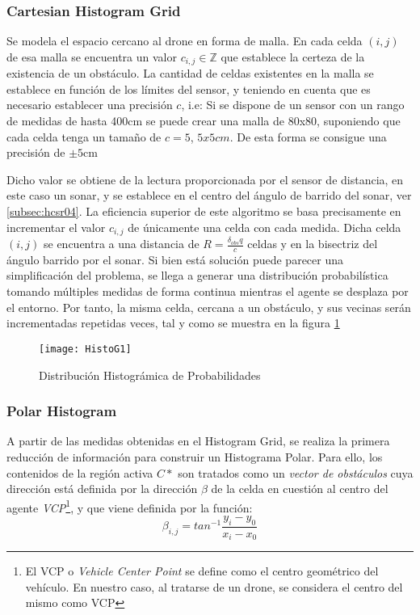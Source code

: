 \subsubsection{Cartesian Histogram Grid}
\label{subsubsec:CHG}
Se modela el espacio cercano al drone en forma de malla. En cada celda $(i,j)$ de esa malla se encuentra un valor $c_{i,j} \in \mathbb{Z}$ que establece la certeza de la existencia de un obstáculo. La cantidad de celdas existentes en la malla se establece en función de los límites del sensor, y teniendo en cuenta que es necesario establecer una precisión $c$, i.e: Si se dispone de un sensor con un rango de medidas de hasta 400cm se puede crear una malla de 80x80, suponiendo que cada celda tenga un tamaño de $c=5$, $5x5cm$. De esta forma se consigue una precisión de $\pm5\text{cm}$

Dicho valor se obtiene de la lectura proporcionada por el sensor de distancia, en este caso un sonar, y se establece en el centro del ángulo de barrido del sonar, ver \ref{subsec:hcsr04}. 
La eficiencia superior de este algoritmo se basa precisamente en incrementar el valor $c_{i,j}$ de únicamente una celda con cada medida. Dicha celda $(i,j)$ se encuentra a una distancia de $R = \frac{\delta_{obs}q}{c}$ celdas y en la bisectriz del ángulo barrido por el sonar.
Si bien está solución puede parecer una simplificación del problema, se llega a generar una distribución probabilística tomando múltiples medidas de forma continua mientras el agente se desplaza por el entorno. Por tanto, la misma celda, cercana a un obstáculo, y sus vecinas serán incrementadas repetidas veces, tal y como se muestra en la figura \ref{fig:histog1}
 \begin{figure}[H]
	\centering
	\texttt{[image: HistoG1]}
	\caption{Distribución Histográmica de Probabilidades}\label{fig:histog1}
\end{figure}

\subsubsection{Polar Histogram}
\label{subsubsec:PH}
A partir de las medidas obtenidas en el Histogram Grid, se realiza la primera reducción de información para construir un Histograma Polar. Para ello, los contenidos de la región activa $C*$ son tratados como un \textit{vector de obstáculos} cuya dirección está definida por la dirección $\beta$ de la celda en cuestión al centro del agente \textit{VCP}\footnote{El VCP o \textit{Vehicle Center Point} se define como el centro geométrico del vehículo. En nuestro caso, al tratarse de un drone, se considera el centro del mismo como VCP}, y que viene definida por la función:
\begin{equation}
\label{equation:ObsAgAng}
\beta_{i,j}= tan^{-1} \frac{y_i - y_0}{x_i - x_0}
\end{equation}

